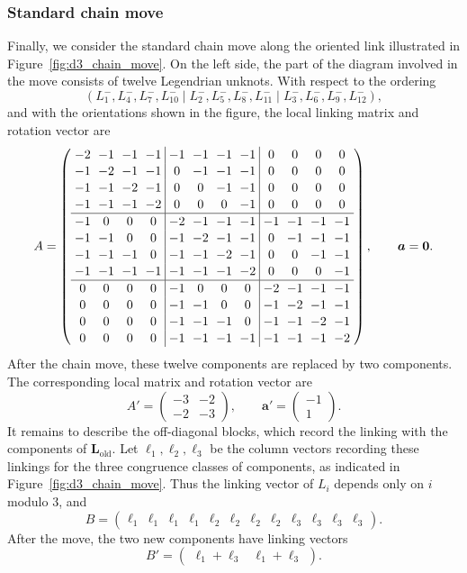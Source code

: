 \documentclass{amsart}
\numberwithin{equation}{section}
\numberwithin{figure}{section}
\theoremstyle{definition}
\theoremstyle{remark}
\begin{document}
\subsubsection*{Standard chain move}
Finally, we consider the standard chain move along the oriented link illustrated in Figure~\ref{fig:d3_chain_move}.
On the left side, the part of the diagram involved in the move consists of twelve Legendrian unknots. With respect to the ordering
\[
(L_1^-,L_4^-,L_7^-,L_{10}^-\mid L_2^-,L_5^-,L_8^-,L_{11}^-\mid L_3^-,L_6^-,L_9^-,L_{12}^-),
\]
and with the orientations shown in the figure, the local linking matrix and rotation vector are
\[
\setlength{\arraycolsep}{3pt}
\renewcommand{\arraystretch}{1.1}
A=
\left(
\begin{array}{cccc|cccc|cccc}
-2&-1&-1&-1&-1&-1&-1&-1&0&0&0&0\\
-1&-2&-1&-1&0&-1&-1&-1&0&0&0&0\\
-1&-1&-2&-1&0&0&-1&-1&0&0&0&0\\
-1&-1&-1&-2&0&0&0&-1&0&0&0&0\\ \hline
-1&0&0&0&-2&-1&-1&-1&-1&-1&-1&-1\\
-1&-1&0&0&-1&-2&-1&-1&0&-1&-1&-1\\
-1&-1&-1&0&-1&-1&-2&-1&0&0&-1&-1\\
-1&-1&-1&-1&-1&-1&-1&-2&0&0&0&-1\\ \hline
0&0&0&0&-1&0&0&0&-2&-1&-1&-1\\
0&0&0&0&-1&-1&0&0&-1&-2&-1&-1\\
0&0&0&0&-1&-1&-1&0&-1&-1&-2&-1\\
0&0&0&0&-1&-1&-1&-1&-1&-1&-1&-2
\end{array}
\right),
\qquad
\boldsymbol a=\boldsymbol 0.
\]
After the chain move, these twelve components are replaced by two components. The corresponding local matrix and rotation vector are
\[
A'=
\begin{pmatrix}
-3 & -2\\
-2 & -3
\end{pmatrix},
\qquad
\boldsymbol a'=
\begin{pmatrix}
-1\\
1
\end{pmatrix}.
\]
It remains to describe the off-diagonal blocks, which record the linking with the components of \(\boldsymbol L_{\mathrm{old}}\). Let
$\boldsymbol\ell_1,\boldsymbol\ell_2,\boldsymbol\ell_3$ be the column vectors recording these linkings for the three congruence classes of components, as indicated in Figure~\ref{fig:d3_chain_move}. Thus the linking vector of \(L_i\) depends only on \(i\) modulo \(3\), and
\[
B=
\left(
\begin{array}{cccc|cccc|cccc}
\boldsymbol\ell_1 & \boldsymbol\ell_1 & \boldsymbol\ell_1 & \boldsymbol\ell_1 &
\boldsymbol\ell_2 & \boldsymbol\ell_2 & \boldsymbol\ell_2 & \boldsymbol\ell_2 &
\boldsymbol\ell_3 & \boldsymbol\ell_3 & \boldsymbol\ell_3 & \boldsymbol\ell_3
\end{array}
\right).
\]
After the move, the two new components have linking vectors
\[
B'=
\left(
\begin{array}{cc}
\boldsymbol\ell_1+\boldsymbol\ell_3 &
\boldsymbol\ell_1+\boldsymbol\ell_3
\end{array}
\right).
\]
\end{document}
